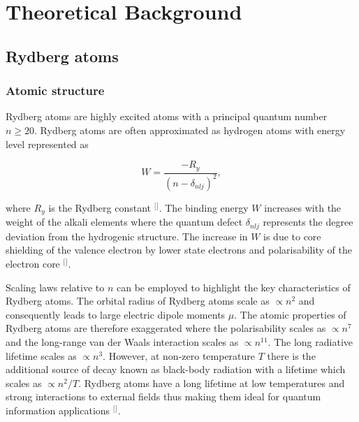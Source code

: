 \section{\label{sec:level1}Theoretical Background}

\subsection{Rydberg atoms}
\subsubsection{Atomic structure}


\noindent Rydberg atoms are highly excited atoms with a principal quantum number $n \geq 20$. Rydberg atoms are often approximated as hydrogen atoms with energy level represented as

\begin{equation}
\label{eq:bindingenergy}
W=\frac{-R_{y}}{(n-\delta_{nlj})^{2}},
\end{equation}

\noindent where $R_{y}$ is the Rydberg constant $^{[}$\citep{Gallagher2005RydbergAtoms}$^{]}$. The binding energy $W$ increases with the weight of the alkali elements where the quantum defect $\delta_{nlj}$ represents the degree deviation from the hydrogenic structure. The increase in $W$ is due to core shielding of the valence electron by lower state electrons and polarisability of the electron core $^{[}$\citep{Pritchard2012CooperativeEnsemble}$^{]}$. 

Scaling laws relative to $n$ can be employed to highlight the key characteristics of Rydberg atoms. The orbital radius of Rydberg atoms scale as $\propto n^{2}$ and consequently leads to large electric dipole moments $\mu$. The atomic properties of Rydberg atoms are therefore exaggerated where the polarisability scales as $\propto n^{7}$ and the long-range van der Waals interaction scales as $\propto n^{11}$. The long radiative lifetime scales as $\propto n^{3}$. However, at non-zero temperature $T$ there is the additional source of decay known as black-body radiation with a lifetime which scales as $\propto n^{2}/T$. Rydberg atoms have a long lifetime at low temperatures and strong interactions to external fields thus making them ideal for quantum information applications $^{[}$\citep{Gallagher1988RydbergAtoms,Walker2008ConsequencesAtoms,Saffman2010QuantumAtoms}$^{]}$.  


